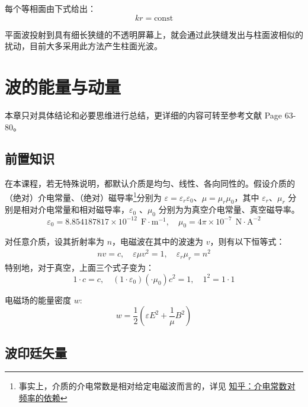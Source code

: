 \documentclass[UTF8]{report}
\theoremstyle{MyLineTheoremStyle} %
\theoremstyle{MyBlockTheoremStyle} %
\theoremstyle{MySubsubsectionStyle} %
\begin{document}
每个等相面由下式给出：
\begin{equation}
    kr = \text{const}
\end{equation}

平面波投射到具有细长狭缝的不透明屏幕上，就会通过此狭缝发出与柱面波相似的扰动，目前大多采用此方法产生柱面光波。

\section{波的能量与动量}

本章只对具体结论和必要思维进行总结，更详细的内容可转至参考文献 \cite{Optics} Page 63-80。

\subsection{前置知识}

在本课程，若无特殊说明，都默认介质是均匀、线性、各向同性的。假设介质的（绝对）介电常量、（绝对）磁导率\footnote{事实上，介质的介电常数是相对给定电磁波而言的，详见 \href{https://zhuanlan.zhihu.com/p/62494685}{知乎：介电常数对频率的依赖}}分别为 $\varepsilon = \varepsilon_r \varepsilon_0$、$\mu = \mu_r \mu_0$，其中 $\varepsilon_r$、$\mu_r$ 分别是相对介电常量和相对磁导率，$\varepsilon_0 $ 、$\mu_0$ 分别为为真空介电常量、真空磁导率。
\begin{equation}
    \varepsilon_0 = 8.854187817 \times 10^{-12}\ \ \mathrm{F\cdot m^{-1}},\quad \mu_0 = 4 \pi \times 10^{-7} \ \ \mathrm{N\cdot A^{-2}} 
\end{equation}

对任意介质，设其折射率为 $n$，电磁波在其中的波速为 $v$，则有以下恒等式：
\begin{gather}
\boxed{
    nv = c ,\quad \varepsilon \mu v^2= 1,\quad \varepsilon_r \mu_r = n^2 
}
\end{gather}
特别地，对于真空，上面三个式子变为：
\begin{equation}
1 \cdot c = c ,\quad (1\cdot \varepsilon_0) (\cdot \mu_0) c^2  = 1,\quad 1^2 = 1\cdot 1
\end{equation}

电磁场的能量密度 $w$: 
\begin{equation}
w = \frac{1}{2}\left( \varepsilon E^2 + \frac{1}{\mu} B^2 \right)
\end{equation}

\subsection{波印廷矢量}
\end{document}
